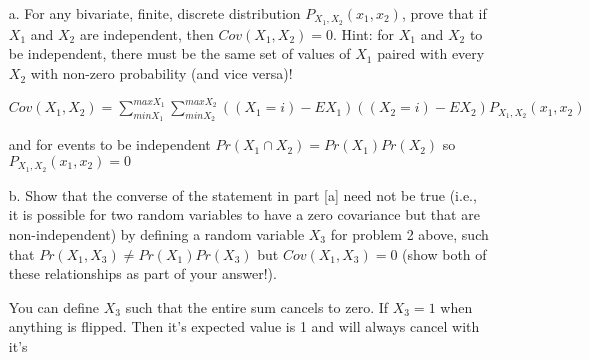 \documentclass[letterpaper, 11pt]{article}
\begin{document}
\begin{itemize}

\item[a.] For any bivariate, finite, discrete distribution $P_{X_1,X_2}(x_1,x_2)$, prove that if $X_1$ and $X_2$ are independent, then $Cov(X_1,X_2)=0$.  Hint: for $X_1$ and $X_2$ to be independent, there must be the same set of values of $X_1$ paired with every $X_2$ with non-zero probability (and vice versa)!

$Cov(X_1, X_2) = \sum_{minX_1}^{maxX_1}\sum_{minX_2}^{maxX_2} ((X_1 = i) - EX_1)((X_2 = i) - EX_2)P_{X_1, X_2}(x_1, x_2)$

and for events to be independent 
$Pr(X_1 \cap X_2) = Pr(X_1)Pr(X_2)$
so 
$P_{X_1, X_2}(x_1, x_2) = 0$
 
 

\item[b.] Show that the converse of the statement in part [a] need not be true (i.e., it is possible for two random variables to have a zero covariance but that are non-independent) by defining a random variable $X_3$ for problem 2 above, such that $Pr(X_1,X_3) \neq Pr(X_1)Pr(X_3)$ but $Cov(X_1,X_3)=0$ (show both of these relationships as part of your answer!). 

You can define $X_3$ such that the entire sum cancels to zero. If $X_3 = 1$ when anything is flipped. Then it’s expected value is 1 and will always cancel with it’s 

\end{itemize}
\end{document}
